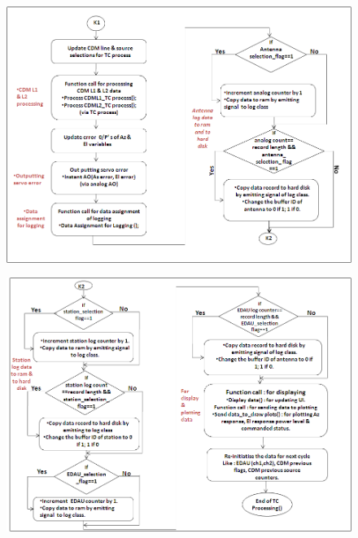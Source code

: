 \begin{figure}[H]
	\centering
	\includegraphics[width=\linewidth]{./FlowCharts/PngFlowCharts/TCP2.png}
\end{figure}

\begin{figure}[H]
	\centering
	\includegraphics[width=\linewidth]{./FlowCharts/PngFlowCharts/TCP3.png}
\end{figure}
